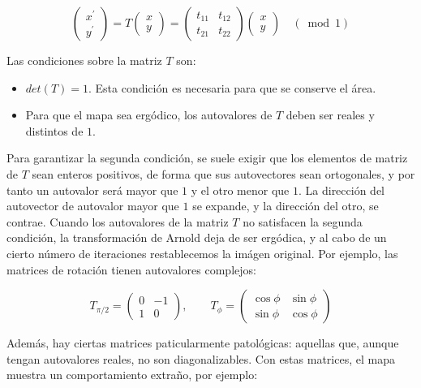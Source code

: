 \documentclass[11pt, a4paper]{article} %
\theoremstyle{named}
\begin{document}
\begin{equation}\label{eq:arnold}
\left(\begin{array}{l}
{x^{\prime}} \\
{y^{\prime}}
\end{array}\right)=T\left(\begin{array}{l}
{x} \\
{y}
\end{array}\right)=\left(\begin{array}{ll}
{t_{11}} & {t_{12}} \\
{t_{21}} & {t_{22}}
\end{array}\right)\left(\begin{array}{l}
{x} \\
{y}
\end{array}\right) \quad(\bmod 1)
\end{equation}

Las condiciones sobre la matriz $T$ son:

\begin{itemize}
    \item $det(T) = 1$. Esta condición es necesaria para que se conserve el área.
    \item Para que el mapa sea ergódico, los autovalores de $T$ deben ser reales y distintos de $1$.
\end{itemize}

Para garantizar la segunda condición, se suele exigir que los elementos de matriz de $T$ sean enteros positivos, de forma que sus autovectores sean ortogonales, y por tanto un autovalor será mayor que $1$ y el otro menor que $1$. La dirección del autovector de autovalor mayor que $1$ se expande, y la dirección del otro, se contrae.
Cuando los autovalores de la matriz $T$ no satisfacen la segunda condición, la transformación de Arnold deja de ser ergódica, y al cabo de un cierto número de iteraciones restablecemos la imágen original. Por ejemplo, las matrices de rotación tienen autovalores complejos:

$$
T_{\pi/2} = \begin{pmatrix} 0 & -1 \\ 1 & 0
\end{pmatrix}, \qquad
T_\phi = \begin{pmatrix} \cos\phi & \sin\phi \\ \sin\phi & \cos\phi
\end{pmatrix}
$$

Además, hay ciertas matrices paticularmente patológicas: aquellas que, aunque tengan autovalores reales, no son diagonalizables. Con estas matrices, el mapa muestra un comportamiento extraño, por ejemplo:
\end{document}
